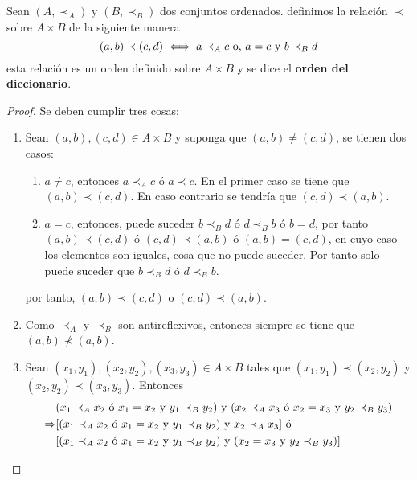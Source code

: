 \documentclass[12pt]{report}
\theoremstyle{largebreak}
\begin{document}
    \begin{mydef}
        Sean $(A,\prec_A)$ y $(B,\prec_B)$ dos conjuntos ordenados. definimos la relación $\prec$ sobre $A\times B$ de la siguiente manera
        \begin{equation*}
            (a,b)\prec(c,d)\iff a\prec_A c\textup{ o, }a = c \textup{ y }b\prec_B d
        \end{equation*}
        esta relación es un orden definido sobre $A\times B$ y se dice el \textbf{orden del diccionario}.
    \end{mydef}

    \begin{proof}
        Se deben cumplir tres cosas:
        \begin{enumerate}
            \item Sean $(a,b),(c,d)\in A\times B$ y suponga que $(a,b)\neq(c,d)$, se tienen dos casos:
            \begin{enumerate}
                \item $a\neq c$, entonces $a\prec_A c$ ó $a\prec c$. En el primer caso se tiene que $(a,b)\prec(c,d)$. En caso contrario se tendría que $(c,d)\prec(a,b)$.
                \item $a=c$, entonces, puede suceder $b\prec_B d$ ó $d\prec_B b$ ó $b=d$, por tanto $(a,b)\prec(c,d)$ ó $(c,d)\prec(a,b)$ ó $(a,b)=(c,d)$, en cuyo caso los elementos son iguales, cosa que no puede suceder. Por tanto solo puede suceder que $b\prec_B d$ ó $d\prec_B b$.
            \end{enumerate}
            por tanto, $(a,b)\prec(c,d)$ o $(c,d)\prec(a,b)$.
            \item Como $\prec_A$ y $\prec_B$ son antireflexivos, entonces siempre se tiene que $(a,b)\nprec (a,b)$.
            \item Sean $(x_1,y_1),(x_2,y_2),(x_3,y_3)\in A\times B$ tales que $(x_1,y_1)\prec(x_2,y_2)$ y $(x_2,y_2)\prec(x_3,y_3)$. Entonces
            \begin{equation*}
                \begin{split}
                    &(x_1\prec_A x_2 \textup{ ó } x_1=x_2 \textup{ y } y_1\prec_B y_2)\textup{ y }(x_2\prec_A x_3 \textup{ ó } x_2=x_3 \textup{ y } y_2\prec_B y_3)\\
                    \Rightarrow &[(x_1\prec_A x_2 \textup{ ó } x_1=x_2 \textup{ y } y_1\prec_B y_2)\textup{ y }x_2\prec_A x_3]\textup{ ó }\\
                    &[(x_1\prec_A x_2 \textup{ ó } x_1=x_2 \textup{ y } y_1\prec_B y_2)\textup{ y }(x_2=x_3 \textup{ y } y_2\prec_B y_3)]\\

\end{split}
\end{equation*}
\end{enumerate}
\end{proof}
\end{document}
